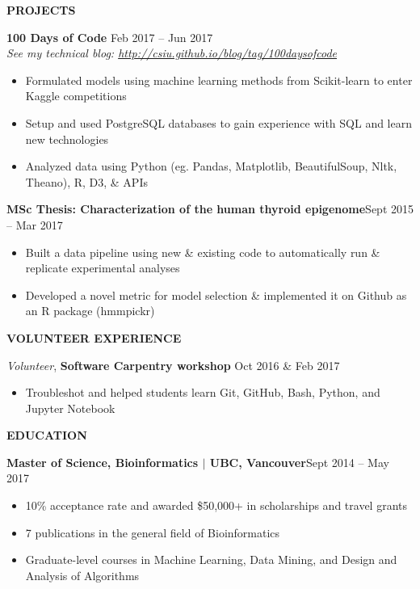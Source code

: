 \documentclass{res}
\renewcommand{\section}[1]{%
  \vspace{0.3in}%
  \centerline{\uppercase{\bf{#1}}}%
  \vspace{-6pt}}
\newcommand{\linehead}[2]{%
  {\bf #1} \hfill #2\\}
\newcommand{\linetitle}[1]{%
  {\sl #1}}
\newcommand{\linevolunteer}[3]{%
  {\sl #3}, {\bf #2} \hfill #1}%
\begin{document}
\begin{resume}
\vspace{-1em}
\section{Projects}

\linehead{100 Days of Code}{Feb 2017 -- Jun 2017}
\linetitle{See my technical blog: \url{http://csiu.github.io/blog/tag/100daysofcode}}
\begin{itemize}
  \item Formulated models using machine learning methods from Scikit-learn to enter Kaggle competitions
  \item Setup and used PostgreSQL databases to gain experience with SQL and learn new technologies
  \item Analyzed data using Python (eg. Pandas, Matplotlib, BeautifulSoup, Nltk, Theano), R, D3, \& APIs
\end{itemize}

\vspace{-0.5em}
{\bf MSc Thesis: Characterization of the human thyroid epigenome}\hfill{Sept 2015 -- Mar 2017}
\begin{itemize}
  \item Built a data pipeline using new \& existing code to automatically run \& replicate experimental analyses
  \item Developed a novel metric for model selection \& implemented it on Github as an R package (hmmpickr)
\end{itemize}

\vspace{-1em}
\section{Volunteer experience}
\linevolunteer{Oct 2016 \& Feb 2017}{%
  Software Carpentry workshop}{%
  Volunteer}
\begin{itemize}
  \item Troubleshot and helped students learn Git, GitHub, Bash, Python, and Jupyter Notebook
\end{itemize}

\vspace{-1em}
\section{Education}
{\bf Master of Science, Bioinformatics $|$ UBC, Vancouver}\hfill{Sept 2014 -- May 2017}
\begin{itemize}
  \item 10\% acceptance rate and awarded \$50,000+ in scholarships and travel grants
  \item 7 publications in the general field of Bioinformatics
  \item Graduate-level courses in Machine Learning, Data Mining, and Design and Analysis of Algorithms
\end{itemize}
\pagebreak

\end{resume}
\end{document}
